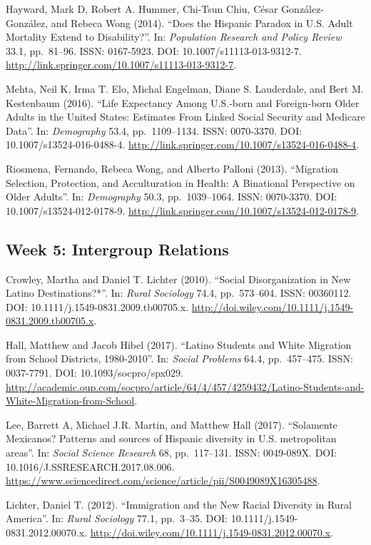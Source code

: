 \documentclass[11pt,]{article}
\begin{document}
Hayward, Mark D, Robert A. Hummer, Chi-Tsun Chiu, César
González-González, and Rebeca Wong (2014). ``Does the Hispanic Paradox
in U.S. Adult Mortality Extend to Disability?''. In:
\emph{Population Research and Policy Review} 33.1, pp.~81--96. ISSN:
0167-5923. DOI: 10.1007/s11113-013-9312-7.
\url{http://link.springer.com/10.1007/s11113-013-9312-7}.

Mehta, Neil K, Irma T. Elo, Michal Engelman, Diane S. Lauderdale, and
Bert M. Kestenbaum (2016). ``Life Expectancy Among U.S.-born and
Foreign-born Older Adults in the United States: Estimates From Linked
Social Security and Medicare Data''. In: \emph{Demography} 53.4,
pp.~1109--1134. ISSN: 0070-3370. DOI: 10.1007/s13524-016-0488-4.
\url{http://link.springer.com/10.1007/s13524-016-0488-4}.

Riosmena, Fernando, Rebeca Wong, and Alberto Palloni (2013). ``Migration
Selection, Protection, and Acculturation in Health: A Binational
Perspective on Older Adults''. In: \emph{Demography} 50.3,
pp.~1039--1064. ISSN: 0070-3370. DOI: 10.1007/s13524-012-0178-9.
\url{http://link.springer.com/10.1007/s13524-012-0178-9}.

\hypertarget{week-5-intergroup-relations}{%
\subsection{Week 5: Intergroup
Relations}\label{week-5-intergroup-relations}}

Crowley, Martha and Daniel T. Lichter (2010). ``Social Disorganization
in New Latino Destinations?*''. In: \emph{Rural Sociology} 74.4,
pp.~573--604. ISSN: 00360112. DOI: 10.1111/j.1549-0831.2009.tb00705.x.
\url{http://doi.wiley.com/10.1111/j.1549-0831.2009.tb00705.x}.

Hall, Matthew and Jacob Hibel (2017). ``Latino Students and White
Migration from School Districts, 1980-2010''. In: \emph{Social Problems}
64.4, pp.~457--475. ISSN: 0037-7791. DOI: 10.1093/socpro/spx029.
\url{http://academic.oup.com/socpro/article/64/4/457/4259432/Latino-Students-and-White-Migration-from-School}.

Lee, Barrett A, Michael J.R. Martin, and Matthew Hall (2017).
``Solamente Mexicanos? Patterns and sources of Hispanic diversity in
U.S. metropolitan areas''. In: \emph{Social Science Research} 68,
pp.~117--131. ISSN: 0049-089X. DOI: 10.1016/J.SSRESEARCH.2017.08.006.
\url{https://www.sciencedirect.com/science/article/pii/S0049089X16305488}.

Lichter, Daniel T. (2012). ``Immigration and the New Racial Diversity in
Rural America''. In: \emph{Rural Sociology} 77.1, pp.~3--35. DOI:
10.1111/j.1549-0831.2012.00070.x.
\url{http://doi.wiley.com/10.1111/j.1549-0831.2012.00070.x}.
\end{document}
